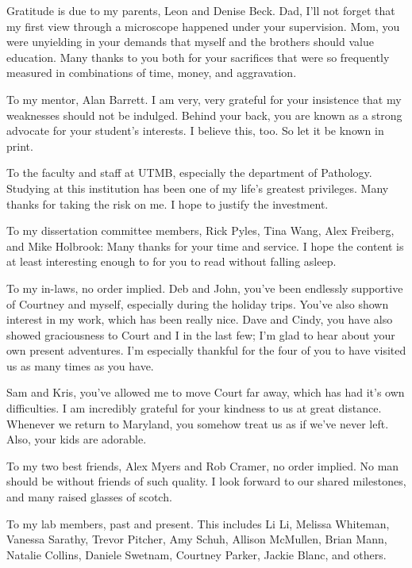 \documentclass[11pt]{report}	%
\theoremstyle{definition}
\theoremstyle{remark}
\begin{document}
\begin{acknowledgments}		%
%
Gratitude is due to my parents, Leon and Denise Beck. Dad, I'll not forget that my first view
through a microscope happened under your supervision. Mom, you were unyielding in your demands
that myself and the brothers should value education. Many thanks to you both for your sacrifices that were so frequently
measured in combinations of time, money, and aggravation.

To my mentor, Alan Barrett. I am very, very grateful for your insistence that my weaknesses
should not be indulged. Behind your back, you are known as a strong advocate for your student's
interests. I believe this, too. So let it be known in print. 

To the faculty and staff at UTMB, especially the department of Pathology. Studying at this institution has been
one of my life's greatest privileges. Many thanks for taking the risk on me. I hope to justify the investment.

To my dissertation committee members, Rick Pyles, Tina Wang, Alex Freiberg, and Mike Holbrook: Many thanks for your time
and service. I hope the content is at least interesting enough to for you to read without falling asleep.

To my in-laws, no order implied. Deb and John, you've been endlessly supportive of Courtney and myself,
especially during the holiday trips. You've also shown interest in my work, which has been
really nice. Dave and Cindy, you have also showed graciousness to Court and I in the last few; I'm glad to hear about your own present adventures. I'm especially thankful for the four of you to have visited us as many times as you have. 

Sam and Kris, you've allowed me to move Court far away, which has had it's own difficulties. I am incredibly 
grateful for your kindness to us at great distance. Whenever we return to Maryland, you somehow treat us as if we've never left. Also,
your kids are adorable.

To my two best friends, Alex Myers and Rob Cramer, no order implied. No man should be
without friends of such quality. I look forward to our shared milestones, and many raised glasses
of scotch.

To my lab members, past and present. This includes Li Li, Melissa Whiteman, Vanessa Sarathy, Trevor Pitcher,
Amy Schuh, Allison McMullen, Brian Mann, Natalie Collins, Daniele Swetnam, Courtney Parker, Jackie Blanc, and others. 


\end{acknowledgments}
\end{document}
